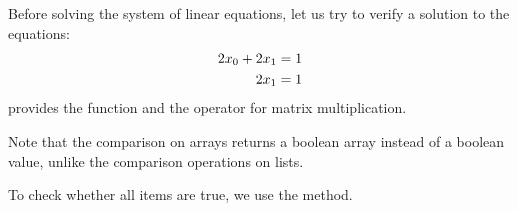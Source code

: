 \documentclass[letterpaper,10pt,english]{sphinxmanual}
\begin{document}
Before solving the system of linear equations, let us try to verify a solution to the equations:
\begin{equation*}
\begin{split} \begin{aligned}
2x_0 + 2x_1 &= 1\\
\hphantom{2x_0 +}  2x_1 &= 1
\end{aligned}
\end{split}
\end{equation*}
 provides the function  and the operator  for matrix multiplication.

\begin{sphinxVerbatim}[commandchars=\\\{\}]
\PYG{p}{[}\PYG{p}{]}  
  \PYG{p}{[}\PYG{p}{]}  
\end{sphinxVerbatim}

\begin{sphinxVerbatim}
\end{sphinxVerbatim}

Note that the comparison on  arrays returns a boolean array instead of a boolean value, unlike the comparison operations on lists.

To check whether all items are true, we use the  method.

\begin{sphinxVerbatim}[commandchars=\\\{\}]
\PYG{p}{[}\PYG{p}{]}  
  \PYG{p}{[}\PYG{p}{]}  
\end{sphinxVerbatim}
\end{document}
